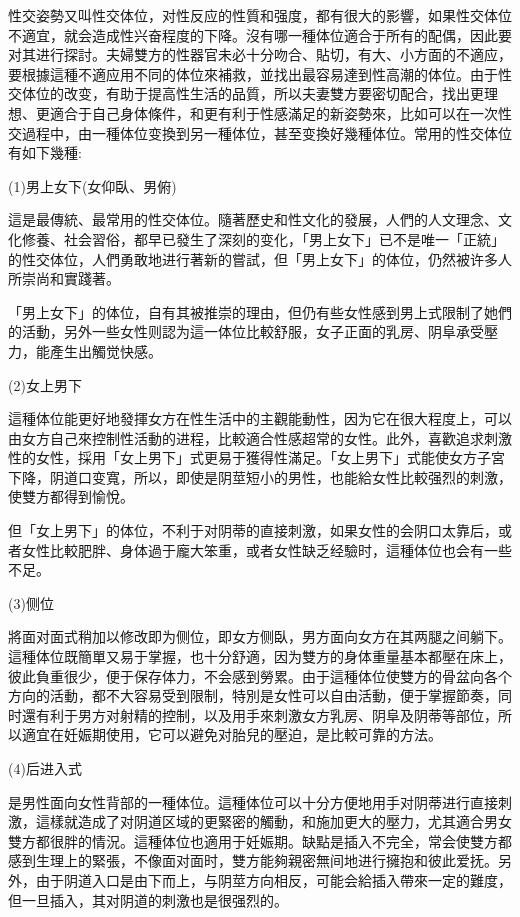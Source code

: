 \documentclass[12pt,UTF8]{ctexbook}
\begin{document}
性交姿勢又叫性交体位，对性反应的性質和强度，都有很大的影響，如果性交体位不適宜，就会造成性兴奋程度的下降。沒有哪一種体位適合于所有的配偶，因此要对其进行探討。夫婦雙方的性器官未必十分吻合、貼切，有大、小方面的不適应，要根據這種不適应用不同的体位來補救，並找出最容易達到性高潮的体位。由于性交体位的改变，有助于提高性生活的品質，所以夫妻雙方要密切配合，找出更理想、更適合于自己身体條件，和更有利于性感滿足的新姿勢來，比如可以在一次性交過程中，由一種体位变換到另一種体位，甚至变換好幾種体位。常用的性交体位有如下幾種:

(1)男上女下(女仰臥、男俯)

這是最傳統、最常用的性交体位。隨著歷史和性文化的發展，人們的人文理念、文化修養、社会習俗，都早已發生了深刻的变化，「男上女下」已不是唯一「正統」的性交体位，人們勇敢地进行著新的嘗試，但「男上女下」的体位，仍然被许多人所崇尚和實踐著。

「男上女下」的体位，自有其被推崇的理由，但仍有些女性感到男上式限制了她們的活動，另外一些女性则認为這一体位比較舒服，女子正面的乳房、阴阜承受壓力，能產生出觸觉快感。

(2)女上男下

這種体位能更好地發揮女方在性生活中的主觀能動性，因为它在很大程度上，可以由女方自己來控制性活動的进程，比較適合性感超常的女性。此外，喜歡追求刺激性的女性，採用「女上男下」式更易于獲得性滿足。「女上男下」式能使女方子宮下降，阴道口变寬，所以，即使是阴莖短小的男性，也能給女性比較强烈的刺激，使雙方都得到愉悅。

但「女上男下」的体位，不利于对阴蒂的直接刺激，如果女性的会阴口太靠后，或者女性比較肥胖、身体過于龐大笨重，或者女性缺乏经驗时，這種体位也会有一些不足。

(3)侧位

將面对面式稍加以修改即为侧位，即女方侧臥，男方面向女方在其两腿之间躺下。這種体位既簡單又易于掌握，也十分舒適，因为雙方的身体重量基本都壓在床上，彼此負重很少，便于保存体力，不会感到勞累。由于這種体位使雙方的骨盆向各个方向的活動，都不大容易受到限制，特別是女性可以自由活動，便于掌握節奏，同时還有利于男方对射精的控制，以及用手來刺激女方乳房、阴阜及阴蒂等部位，所以適宜在妊娠期使用，它可以避免对胎兒的壓迫，是比較可靠的方法。

(4)后进入式

是男性面向女性背部的一種体位。這種体位可以十分方便地用手对阴蒂进行直接刺激，這樣就造成了对阴道区域的更緊密的觸動，和施加更大的壓力，尤其適合男女雙方都很胖的情況。這種体位也適用于妊娠期。缺點是插入不完全，常会使雙方都感到生理上的緊張，不像面对面时，雙方能夠親密無间地进行擁抱和彼此爱抚。另外，由于阴道入口是由下而上，与阴莖方向相反，可能会給插入帶來一定的難度，但一旦插入，其对阴道的刺激也是很强烈的。
\end{document}
